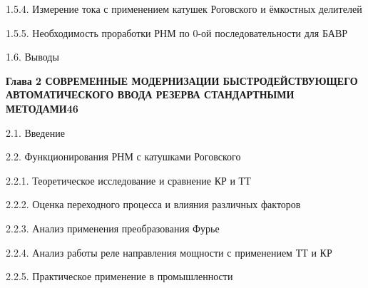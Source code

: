 \noindent\hspace*{3.0em}1.5.4. Измерение тока с применением катушек Роговского и ёмкостных делителей\par\vspace{0.5mm}
\noindent\hspace*{3.0em}1.5.5. Необходимость проработки РНМ по 0-ой последовательности для БАВР\par\vspace{0.5mm}
\noindent\hspace*{1.5em}1.6. Выводы\par\vspace{0.5mm}
\noindent\textbf{Глава 2 СОВРЕМЕННЫЕ МОДЕРНИЗАЦИИ БЫСТРОДЕЙСТВУЮЩЕГО АВТОМАТИЧЕСКОГО ВВОДА РЕЗЕРВА СТАНДАРТНЫМИ МЕТОДАМИ}\dotfill\textbf{46}\par\vspace{1.5mm}
\noindent\hspace*{1.5em}2.1. Введение\par\vspace{0.5mm}
\noindent\hspace*{1.5em}2.2. Функционирования РНМ с катушками Роговского\par\vspace{0.5mm}
\noindent\hspace*{3.0em}2.2.1. Теоретическое исследование и сравнение КР и ТТ\par\vspace{0.5mm}
\noindent\hspace*{3.0em}2.2.2. Оценка переходного процесса и влияния различных факторов\par\vspace{0.5mm}
\noindent\hspace*{3.0em}2.2.3. Анализ применения преобразования Фурье\par\vspace{0.5mm}
\noindent\hspace*{3.0em}2.2.4. Анализ работы реле направления мощности с применением ТТ и КР\par\vspace{0.5mm}
\noindent\hspace*{3.0em}2.2.5. Практическое применение в промышленности\par\vspace{0.5mm}
